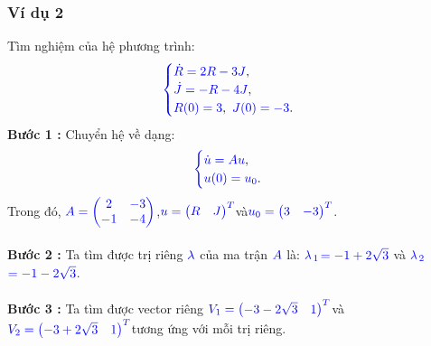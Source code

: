 \documentclass[a4paper]{article}
\begin{document}
\subsubsection{Ví dụ 2}
Tìm nghiệm của hệ phương trình:
\begin{align}
	    \textcolor{blue}{
	    \begin{cases}
            \dot R = 2R - 3J \textcolor{black}{,}\\
            \dot J = -R - 4J \textcolor{black}{,}\\
            R(0) = 3\textcolor{black}{,} \enskip J(0) = -3 \textcolor{black}{.}
        \end{cases}
        }
        \notag
	\end{align}
{\bfseries Bước 1 :} Chuyển hệ về dạng:
\begin{align}
	    \textcolor{blue}{
	    \begin{cases}
            \dot u = Au \textcolor{black}{,}\\
            u(0) = u\sb{0}\textcolor{black}{.}
        \end{cases}
        }
        \notag
	\end{align}
Trong đó,  $\textcolor{blue}{A = \begin{pmatrix} 2 & -3\\ -1 & -4 \end{pmatrix}}$,\enskip $\textcolor{blue}{u = \begin{pmatrix} R & J \end{pmatrix}\sp{T}}$\enskip và\enskip $\textcolor{blue}{u\sb{0} = \begin{pmatrix} 3 & -3 \end{pmatrix}\sp{T}}$.\\\\
{\bfseries Bước 2 :} Ta tìm được trị riêng $\textcolor{blue}{\lambda}$ của ma trận $\textcolor{blue}{A}$ là: $\textcolor{blue}{\lambda}$$\textcolor{blue}{\sb{1}}$$\textcolor{blue}{=-1+2\sqrt{3}}$ và $\textcolor{blue}{\lambda}$$\textcolor{blue}{\sb{2}}$$\textcolor{blue}{=-1-2\sqrt{3}}$.\\\\
{\bfseries Bước 3 :} Ta tìm được vector riêng \enskip $\textcolor{blue}{V\sb{1} = \begin{pmatrix} -3-2\sqrt{3} & 1 \end{pmatrix}\sp{T}}$\enskip và \enskip $\textcolor{blue}{V\sb{2} = \begin{pmatrix} -3+2\sqrt{3} & 1 \end{pmatrix}\sp{T}}$\enskip tương ứng với mỗi trị riêng.\\\\
\end{document}
